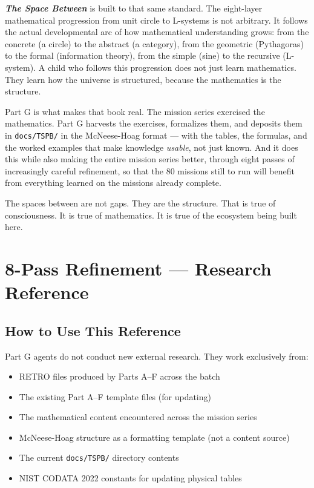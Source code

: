 \documentclass[11pt,letterpaper]{article}
\newcommand{\stageheader}[2]{%
  \noindent\colorbox{#2}{\makebox[\textwidth][l]{%
    \textcolor{white}{\bfseries\sffamily\hspace{6pt}#1\hspace{6pt}}}}%
  \vspace{0.5em}\par%
}
\newcommand{\tspb}{\textbf{\textit{The Space Between}}}
\begin{document}
\tspb{} is built to that same standard. The eight-layer mathematical progression from unit circle to L-systems is not arbitrary. It follows the actual developmental arc of how mathematical understanding grows: from the concrete (a circle) to the abstract (a category), from the geometric (Pythagoras) to the formal (information theory), from the simple (sine) to the recursive (L-system). A child who follows this progression does not just learn mathematics. They learn how the universe is structured, because the mathematics is the structure.

Part G is what makes that book real. The mission series exercised the mathematics. Part G harvests the exercises, formalizes them, and deposits them in \texttt{docs/TSPB/} in the McNeese-Hoag format --- with the tables, the formulas, and the worked examples that make knowledge \textit{usable}, not just known. And it does this while also making the entire mission series better, through eight passes of increasingly careful refinement, so that the 80 missions still to run will benefit from everything learned on the missions already complete.

The spaces between are not gaps. They are the structure. That is true of consciousness. It is true of mathematics. It is true of the ecosystem being built here.

\newpage

\stageheader{STAGE 2 --- RESEARCH REFERENCE}{secondary}

\section{8-Pass Refinement --- Research Reference}

\subsection{How to Use This Reference}

Part G agents do not conduct new external research. They work exclusively from:
\begin{itemize}[leftmargin=*, itemsep=2pt]
  \item RETRO files produced by Parts A--F across the batch
  \item The existing Part A--F template files (for updating)
  \item The mathematical content encountered across the mission series
  \item McNeese-Hoag structure as a formatting template (not a content source)
  \item The current \texttt{docs/TSPB/} directory contents
  \item NIST CODATA 2022 constants for updating physical tables
\end{itemize}
\end{document}
